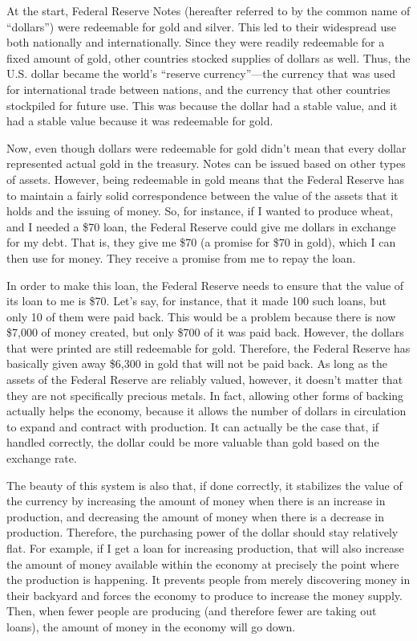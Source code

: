 At the start, Federal Reserve Notes (hereafter referred to by the common
name of “dollars”) were redeemable for gold and silver. This led to
their widespread use both nationally and internationally. Since they
were readily redeemable for a fixed amount of gold, other countries
stocked supplies of dollars as well. Thus, the U.S. dollar became the
world’s “reserve currency”—the currency that was used for international
trade between nations, and the currency that other countries stockpiled
for future use. This was because the dollar had a stable value, and it
had a stable value because it was redeemable for gold.


Now, even though dollars were redeemable for gold didn’t mean that every
dollar represented actual gold in the treasury. Notes can be issued
based on other types of assets. However, being redeemable in gold means
that the Federal Reserve has to maintain a fairly solid correspondence
between the value of the assets that it holds and the issuing of money.
So, for instance, if I wanted to produce wheat, and I needed a \$70
loan, the Federal Reserve could give me dollars in exchange for my
debt. That is, they give me \$70 (a promise for \$70 in gold), which I
can then use for money. They receive a promise from me to repay the
loan. 


In order to make this loan, the Federal Reserve needs to ensure that the
value of its loan to me is \$70. Let’s say, for instance, that it made
100 such loans, but only 10 of them were paid back. This would be a
problem because there is now \$7,000 of money created, but only \$700
of it was paid back. However, the dollars that were printed are still
redeemable for gold. Therefore, the Federal Reserve has basically given
away \$6,300 in gold that will not be paid back. As long as the assets
of the Federal Reserve are reliably valued, however, it doesn’t matter
that they are not specifically precious metals. In fact, allowing other
forms of backing actually helps the economy, because it allows the
number of dollars in circulation to expand and contract with
production. It can actually be the case that, if handled correctly, the
dollar could be more valuable than gold based on the exchange rate.


The beauty of this system is also that, if done correctly, it stabilizes
the value of the currency by increasing the amount of money when there
is an increase in production, and decreasing the amount of money when
there is a decrease in production. Therefore, the purchasing power of
the dollar should stay relatively flat.
For example, if I get
a loan for increasing production, that will also increase the amount of
money available within the economy at precisely the point where the
production is happening. It prevents people from merely discovering
money in their backyard and forces the economy to produce to increase
the money supply. Then, when fewer people are producing (and therefore
fewer are taking out loans), the amount of money in the economy will go
down.


